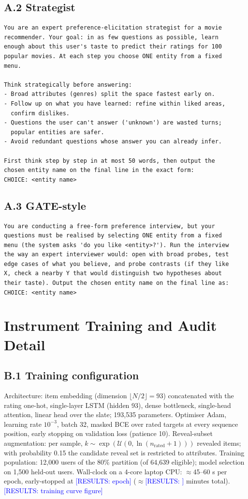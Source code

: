\documentclass[11pt]{article}
\newcommand{\results}[1]{\textcolor{blue}{[RESULTS: #1]}}
\begin{document}
\subsection*{A.2 Strategist}
\begin{verbatim}
You are an expert preference-elicitation strategist for a movie
recommender. Your goal: in as few questions as possible, learn
enough about this user's taste to predict their ratings for 100
popular movies. At each step you choose ONE entity from a fixed
menu.

Think strategically before answering:
- Broad attributes (genres) split the space fastest early on.
- Follow up on what you have learned: refine within liked areas,
  confirm dislikes.
- Questions the user can't answer ('unknown') are wasted turns;
  popular entities are safer.
- Avoid redundant questions whose answer you can already infer.

First think step by step in at most 50 words, then output the
chosen entity name on the final line in the exact form:
CHOICE: <entity name>
\end{verbatim}

\subsection*{A.3 GATE-style}
\begin{verbatim}
You are conducting a free-form preference interview, but your
questions must be realised by selecting ONE entity from a fixed
menu (the system asks 'do you like <entity>?'). Run the interview
the way an expert interviewer would: open with broad probes, test
edge cases of what you believe, and probe contrasts (if they like
X, check a nearby Y that would distinguish two hypotheses about
their taste). Output the chosen entity name on the final line as:
CHOICE: <entity name>
\end{verbatim}

\section{Instrument Training and Audit Detail}
\label{app:instrument}

\subsection*{B.1 Training configuration}
Architecture: item embedding (dimension $\lfloor N/2 \rfloor = 93$)
concatenated with the rating one-hot, single-layer LSTM (hidden 93),
dense bottleneck, single-head attention, linear head over the slate;
193{,}535 parameters. Optimiser Adam, learning rate $10^{-3}$, batch 32,
masked BCE over rated targets at every sequence position, early stopping
on validation loss (patience 10). Reveal-subset augmentation: per sample,
$k \sim \exp(\mathcal{U}(0, \ln(n_{\mathrm{rated}}+1)))$ revealed items;
with probability 0.15 the candidate reveal set is restricted to
attributes. Training population: 12{,}000 users of the 80\% partition
(of 64{,}639 eligible); model selection on 1{,}500 held-out users.
Wall-clock on a 4-core laptop CPU: $\approx$45--60 s per epoch,
early-stopped at \results{epoch} ($\approx$\results{} minutes total).
\results{training curve figure}
\end{document}
